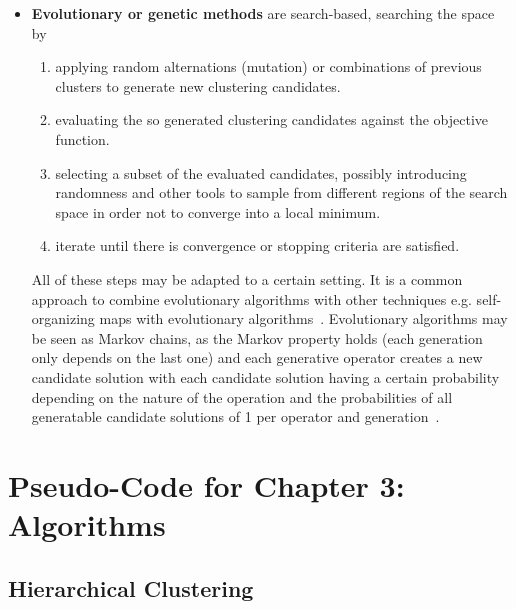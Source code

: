 \begin{itemize}
    \item \textbf{Evolutionary or genetic methods} are search-based, searching the space by 
        \begin{enumerate}
            \item applying random alternations (mutation) or combinations of previous clusters to generate new clustering candidates.
            \item evaluating the so generated clustering candidates against the objective function.
            \item selecting a subset of the evaluated candidates, possibly introducing randomness and other tools to sample from different regions of the search space in order not to converge into a local minimum.
            \item iterate until there is convergence or stopping criteria are satisfied.
        \end{enumerate}
        All of these steps may be adapted to a certain setting. It is a common approach to combine evolutionary algorithms with other techniques e.g. self-organizing maps with evolutionary algorithms~\cite{leng2006design}. Evolutionary algorithms may be seen as Markov chains, as the Markov property holds (each generation only depends on the last one) and each generative operator creates a new candidate solution with each candidate solution having a certain probability depending on the nature of the operation and the probabilities of all generatable candidate solutions of 1 per operator and generation~\cite{Nix1992}.
\end{itemize}

\section{Pseudo-Code for Chapter 3: Algorithms}
\subsection{Hierarchical Clustering}
